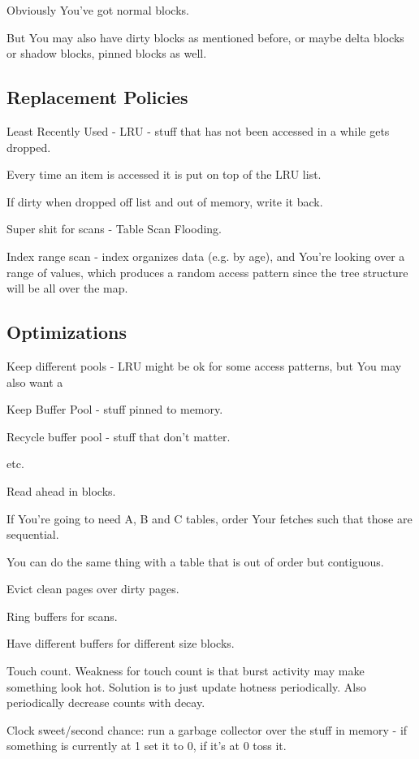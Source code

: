 \documentclass{article}
\begin{document}
			Obviously You've got normal blocks.
			
			But You may also have dirty blocks as mentioned before, or maybe delta blocks or shadow blocks, pinned blocks as well.
			
		\subsection{Replacement Policies}
		
			Least Recently Used - LRU - stuff that has not been accessed in a while gets dropped.
			
			Every time an item is accessed it is put on top of the LRU list.
			
			If dirty when dropped off list and out of memory, write it back.
			
			Super shit for scans - Table Scan Flooding.
			
			Index range scan - index organizes data (e.g. by age), and You're looking over a range of values, which produces a random access pattern since the tree structure will be all over the map.
			
		\subsection{Optimizations}
		
			Keep different pools - LRU might be ok for some access patterns, but You may also want a 
			
			Keep Buffer Pool - stuff pinned to memory.
			
			Recycle buffer pool - stuff that don't matter.
			
			etc.
			
			Read ahead in blocks.
			
			If You're going to need A, B and C tables, order Your fetches such that those are sequential.
			
			You can do the same thing with a table that is out of order but contiguous.
			
			Evict clean pages over dirty pages.
			
			Ring buffers for scans.
			
			Have different buffers for different size blocks.
			
			Touch count. Weakness for touch count is that burst activity may make something look hot. Solution is to just update hotness periodically. Also periodically decrease counts with decay.
			
			Clock sweet/second chance: run a garbage collector over the stuff in memory - if something is currently at 1 set it to 0, if it's at 0 toss it.
			
\end{document}

